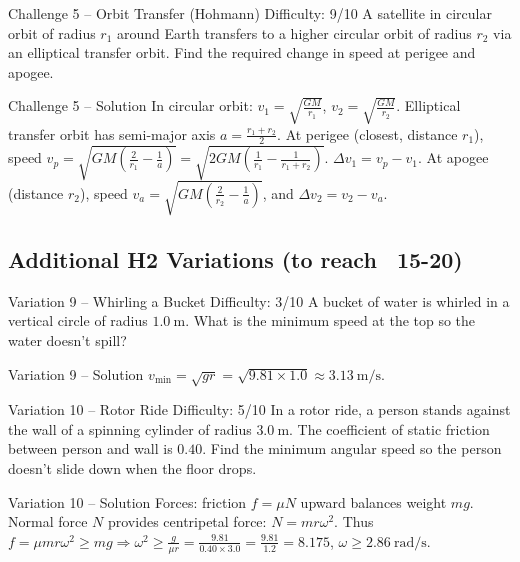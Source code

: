 \documentclass[11pt]{beamer}
\begin{document}
\begin{frame}[shrink=15]{Challenge 5 – Orbit Transfer (Hohmann) \hfill Difficulty: 9/10}
A satellite in circular orbit of radius $r_1$ around Earth transfers to a higher circular orbit of radius $r_2$ via an elliptical transfer orbit. Find the required change in speed at perigee and apogee.
\end{frame}

\begin{frame}[shrink=15]{Challenge 5 – Solution}
In circular orbit: $v_1 = \sqrt{\frac{GM}{r_1}}$, $v_2 = \sqrt{\frac{GM}{r_2}}$.
Elliptical transfer orbit has semi-major axis $a = \frac{r_1 + r_2}{2}$.
At perigee (closest, distance $r_1$), speed $v_p = \sqrt{GM\left(\frac{2}{r_1} - \frac{1}{a}\right)} = \sqrt{2GM\left(\frac{1}{r_1} - \frac{1}{r_1+r_2}\right)}$.
$\Delta v_1 = v_p - v_1$.
At apogee (distance $r_2$), speed $v_a = \sqrt{GM\left(\frac{2}{r_2} - \frac{1}{a}\right)}$, and $\Delta v_2 = v_2 - v_a$.
\end{frame}

\subsection{Additional H2 Variations (to reach ~15-20)}

\begin{frame}[shrink=15]{Variation 9 – Whirling a Bucket \hfill Difficulty: 3/10}
A bucket of water is whirled in a vertical circle of radius $1.0\ \mathrm{m}$. What is the minimum speed at the top so the water doesn't spill?
\end{frame}

\begin{frame}{Variation 9 – Solution}
$v_{\min} = \sqrt{gr} = \sqrt{9.81\times1.0} \approx 3.13\ \mathrm{m/s}$.
\end{frame}

\begin{frame}[shrink=15]{Variation 10 – Rotor Ride \hfill Difficulty: 5/10}
In a rotor ride, a person stands against the wall of a spinning cylinder of radius $3.0\ \mathrm{m}$. The coefficient of static friction between person and wall is $0.40$. Find the minimum angular speed so the person doesn't slide down when the floor drops.
\end{frame}

\begin{frame}{Variation 10 – Solution}
Forces: friction $f = \mu N$ upward balances weight $mg$. Normal force $N$ provides centripetal force: $N = m r \omega^2$.
Thus $f = \mu m r \omega^2 \ge mg \Rightarrow \omega^2 \ge \frac{g}{\mu r} = \frac{9.81}{0.40\times3.0} = \frac{9.81}{1.2} = 8.175$, $\omega \ge 2.86\ \mathrm{rad/s}$.
\end{frame}
\end{document}
